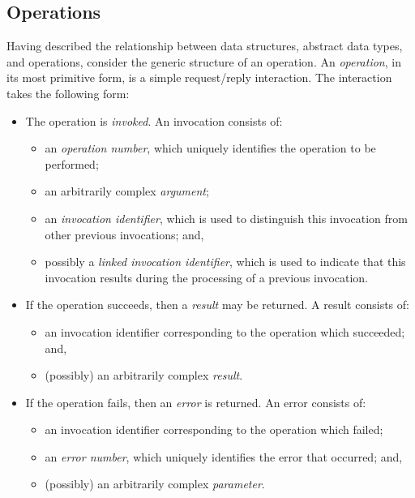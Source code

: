 \subsection	{Operations}
Having described the relationship between data structures,
abstract data types,
and operations,
consider the generic structure of an operation.
An {\em operation}, in its most primitive form,
is a simple request/reply interaction.
The interaction takes the following form:
\begin{itemize}
\item	The operation is {\em invoked}.
	An invocation consists of:
	\begin{itemize}
	\item	an {\em operation number},
		which uniquely identifies the operation to be performed;

	\item	an arbitrarily complex {\em argument\/};

	\item	an {\em invocation identifier},
		which is used to distinguish this invocation from other
		previous invocations;
		and,

	\item	possibly a {\em linked invocation identifier},
		which is used to indicate that this invocation results
		during the processing of a previous invocation.
	\end{itemize}

\item	If the operation succeeds, then a {\em result\/} may be returned.
	A result consists of:
	\begin{itemize}
	\item	an invocation identifier corresponding to the operation
		which succeeded;
		and,

	\item	(possibly) an arbitrarily complex {\em result}.
	\end{itemize}

\item	If the operation fails, then an {\em error\/} is returned.
	An error consists of:
	\begin{itemize}
	\item	an invocation identifier corresponding to the operation
		which failed;

	\item	an {\em error number},
		which uniquely identifies the error that occurred;
		and,

	\item	(possibly) an arbitrarily complex {\em parameter}.
	\end{itemize}


\end{itemize}
